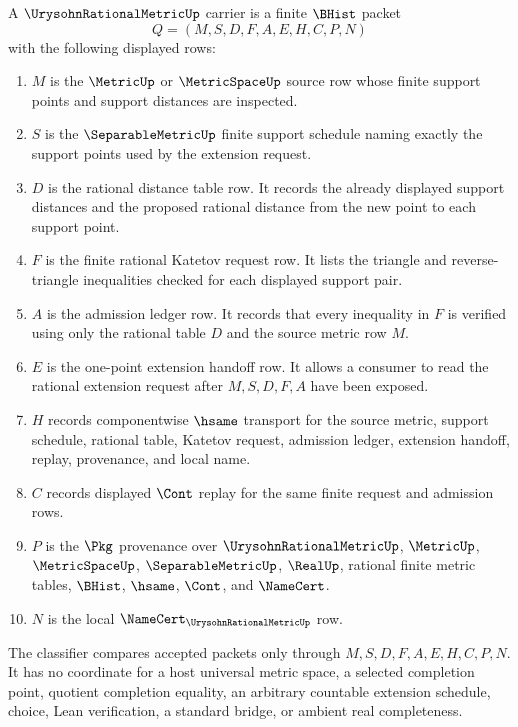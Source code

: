 \begin{definition}
\label{def:urysohn-rational-metric-carrier}
A $\UrysohnRationalMetricUp$ carrier is a finite $\BHist$ packet
$$
Q=(M,S,D,F,A,E,H,C,P,N)
$$
with the following displayed rows:
\begin{enumerate}
\item $M$ is the $\MetricUp$ or $\MetricSpaceUp$ source row whose finite support points and support distances are inspected.
\item $S$ is the $\SeparableMetricUp$ finite support schedule naming exactly the support points used by the extension request.
\item $D$ is the rational distance table row. It records the already displayed support distances and the proposed rational distance from the new point to each support point.
\item $F$ is the finite rational Katetov request row. It lists the triangle and reverse-triangle inequalities checked for each displayed support pair.
\item $A$ is the admission ledger row. It records that every inequality in $F$ is verified using only the rational table $D$ and the source metric row $M$.
\item $E$ is the one-point extension handoff row. It allows a consumer to read the rational extension request after $M,S,D,F,A$ have been exposed.
\item $H$ records componentwise $\hsame$ transport for the source metric, support schedule, rational table, Katetov request, admission ledger, extension handoff, replay, provenance, and local name.
\item $C$ records displayed $\Cont$ replay for the same finite request and admission rows.
\item $P$ is the $\Pkg$ provenance over $\UrysohnRationalMetricUp$, $\MetricUp$, $\MetricSpaceUp$, $\SeparableMetricUp$, $\RealUp$, rational finite metric tables, $\BHist$, $\hsame$, $\Cont$, and $\NameCert$.
\item $N$ is the local $\NameCert_{\UrysohnRationalMetricUp}$ row.
\end{enumerate}
The classifier compares accepted packets only through $M,S,D,F,A,E,H,C,P,N$. It has no coordinate for a host universal metric space, a selected completion point, quotient completion equality, an arbitrary countable extension schedule, choice, Lean verification, a standard bridge, or ambient real completeness.
\end{definition}

